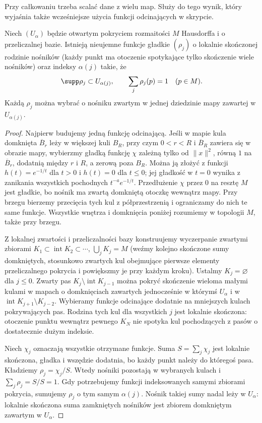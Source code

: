 Przy całkowaniu trzeba scalać dane z wielu map.
Służy do tego wynik, który wyjaśnia także wcześniejsze
użycia funkcji odcinających w skrypcie.

\begin{twierdzenie}
\label{thm:podzial-jednosci-formy}
Niech $(U_\alpha)$ będzie otwartym pokryciem rozmaitości
$M$ Hausdorffa i o przeliczalnej bazie. Istnieją
nieujemne funkcje gładkie $(\rho_j)$ o lokalnie skończonej
rodzinie nośników (każdy punkt ma otoczenie spotykające
tylko skończenie wiele nośników) oraz indeksy $\alpha(j)$ takie, że
\[
 \supp\rho_j\subset U_{\alpha(j)},
 \qquad \sum_j\rho_j(p)=1\quad(p\in M).
\]
Każdą $\rho_j$ można wybrać o nośniku zwartym
w jednej dziedzinie mapy zawartej w $U_{\alpha(j)}$.
\end{twierdzenie}
\begin{proof}
Najpierw budujemy jedną funkcję odcinającą.
Jeśli w mapie kula domknięta $\overline B_r$
leży w większej kuli $B_R$, przy czym $0<r<R$
i $\overline B_R$ zawiera się w obrazie mapy,
wybierzmy gładką funkcję $\chi$ zależną tylko
od $\|x\|^2$, równą $1$ na $\overline B_r$,
dodatnią między $r$ i $R$, a zerową poza $B_R$.
Można ją złożyć z funkcji $h(t)=e^{-1/t}$ dla
$t>0$ i $h(t)=0$ dla $t\leq0$; jej gładkość w
$t=0$ wynika z zanikania wszystkich pochodnych
$t^{-a}e^{-1/t}$. Przedłużenie $\chi$ przez $0$
na resztę $M$ jest gładkie, bo nośnik ma zwartą
domkniętą otoczkę wewnątrz mapy. Przy brzegu bierzemy
przecięcia tych kul z półprzestrzenią i ograniczamy do nich
te same funkcje. Wszystkie wnętrza i domknięcia poniżej
rozumiemy w topologii $M$, także przy brzegu.

Z lokalnej zwartości i przeliczalności bazy
konstruujemy wyczerpanie zwartymi zbiorami
$K_1\subset\operatorname{int}K_2\subset\cdots$,
$\bigcup_jK_j=M$ (weźmy kolejno skończone
sumy domkniętych, stosunkowo zwartych kul
obejmujące pierwsze elementy przeliczalnego
pokrycia i powiększmy je przy każdym kroku).
Ustalmy $K_j=\varnothing$ dla $j\leq0$.
Zwarty pas $K_j\setminus\operatorname{int}K_{j-1}$
można pokryć skończenie wieloma małymi kulami
w mapach o domknięciach zawartych jednocześnie
w którymś $U_\alpha$ i w
$\operatorname{int}K_{j+1}\setminus K_{j-2}$.
Wybieramy funkcje odcinające dodatnie na
mniejszych kulach pokrywających pas.
Rodzina tych kul dla wszystkich $j$ jest
lokalnie skończona: otoczenie punktu wewnątrz
pewnego $K_N$ nie spotyka kul pochodzących
z pasów o dostatecznie dużym indeksie.

Niech $\chi_j$ oznaczają wszystkie otrzymane
funkcje. Suma $S=\sum_j\chi_j$ jest lokalnie
skończona, gładka i wszędzie dodatnia, bo
każdy punkt należy do któregoś pasa. Kładziemy
$\rho_j=\chi_j/S$. Wtedy nośniki pozostają
w wybranych kulach i
$\sum_j\rho_j=S/S=1$.
Gdy potrzebujemy funkcji indeksowanych samymi zbiorami
pokrycia, sumujemy $\rho_j$ o tym samym $\alpha(j)$.
Nośnik takiej sumy nadal leży w $U_\alpha$:
lokalnie skończona suma zamkniętych nośników jest
zbiorem domkniętym zawartym w $U_\alpha$.
\end{proof}

